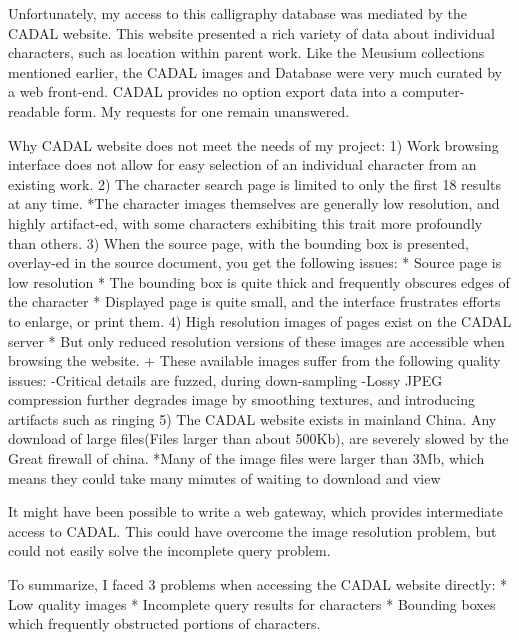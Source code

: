 Unfortunately, my access to this calligraphy database was mediated by the CADAL website.  This website presented a rich variety of data about individual characters, such as location within parent work.  Like the Meusium collections mentioned earlier, the CADAL images and Database were very much curated by a web front-end.  CADAL provides no option export data into a computer-readable form.  My requests for one remain unanswered.

    Why CADAL website does not meet the needs of my project:
        1)  Work browsing interface does not allow for easy selection of an individual character from an existing work.
        2)  The character search page is limited to only the first 18 results at any time.
            *The character images themselves are generally low resolution, and highly artifact-ed, with some characters exhibiting this trait more profoundly than others.
        3)  When the source page, with the bounding box is presented, overlay-ed in the source document, you get the following issues:
            *  Source page is low resolution
            *  The bounding box is quite thick and frequently obscures edges of the character
            *  Displayed page is quite small, and the interface frustrates efforts to enlarge, or print them.
        4)  High resolution images of pages exist on the CADAL server
            * But only reduced resolution versions of these images are accessible when browsing the website.
                + These available images suffer from the following quality issues:
                    -Critical details are fuzzed, during down-sampling
                    -Lossy JPEG compression further degrades image by smoothing textures, and introducing artifacts such as ringing
        5)  The CADAL website exists in mainland China.  Any download of large files(Files larger than about 500Kb), are severely slowed by the Great firewall of china.
            *Many of the image files were larger than 3Mb, which means they could take many minutes of waiting to download and view
        
        
    It might have been possible to write a web gateway, which provides intermediate access to CADAL.  This could have overcome the image resolution problem, but could not easily solve the incomplete query problem.
    
    To summarize, I faced 3 problems when accessing the CADAL website directly:
        *  Low quality images
        *  Incomplete query results for characters
        *  Bounding boxes which frequently obstructed portions of characters.
                    

